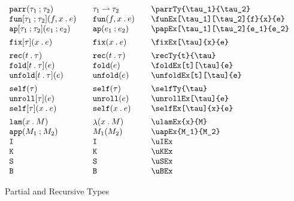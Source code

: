 \documentclass[11pt]{article}
\begin{document}
\begin{figure}

  \begin{small}
    \begin{displaymath}
      \begin{array}{l@{\qquad}l@{\qquad}l@{\qquad}l}
        \parrTy{\tau_1}{\tau_2}         & \parrTy*{\tau_1}{\tau_2} & \verb|\parrTy{\tau_1}{\tau_2}|          \\
        \funEx[\tau_1][\tau_2]{f}{x}{e} & \funEx*{f}{x}{e}         & \verb|\funEx[\tau_1][\tau_2]{f}{x}{e}|  \\
        \papEx{e_1}{e_2}                & \papEx*{e_1}{e_2}        & \verb|\papEx[\tau_1][\tau_2]{e_1}{e_2}| \\[1ex]

        \fixEx[\tau]{x}{e}              & \fixEx*[\tau]{x}{e}      & \verb|\fixEx[\tau]{x}{e}|               \\[1ex]

        \recTy{t}{\tau}                 & \recTy*{t}{\tau}         & \verb|\recTy{t}{\tau}|                  \\
        \foldEx[t][\tau]{e}             & \foldEx*{e}              & \verb|\foldEx[t][\tau]{e}|              \\
        \unfoldEx[t][\tau]{e}           & \unfoldEx*{e}            & \verb|\unfoldEx[t][\tau]{e}|            \\[1ex]

        \selfTy{\tau}                   & \selfTy*{\tau}           & \verb|\selfTy{\tau}|                    \\
        \unrollEx[\tau]{e}              & \unrollEx*{e}            & \verb|\unrollEx[\tau]{e}|               \\
        \selfEx[\tau]{x}{e}             & \selfEx*{x}{e}           & \verb|\selfEx[\tau]{x}{e}|              \\[1ex]

        \ulamEx{x}{M}                   & \ulamEx*{x}{M}           & \verb|\ulamEx{x}{M}|                    \\
        \uapEx{M_1}{M_2}                & \uapEx*{M_1}{M_2}        & \verb|\uapEx{M_1}{M_2}|                 \\
        \uIEx                           & \uIEx*                   & \verb|\uIEx|                            \\
        \uKEx                           & \uKEx*                   & \verb|\uKEx|                            \\
        \uSEx                           & \uSEx*                   & \verb|\uSEx|                            \\
        \uBEx                           & \uBEx*                   & \verb|\uBEx|
      \end{array}
    \end{displaymath}
  \end{small}

  \caption{Partial and Recursive Types}
  \label{fig:recursive}
\end{figure}
\end{document}
